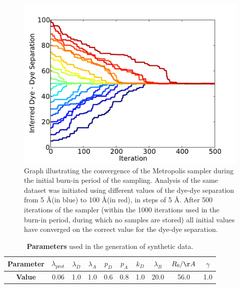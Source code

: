 \begin{figure}
   \begin{center}
      \includegraphics*[width=5in]{inference/S3_samples_summary_rsep.pdf}
      \caption{Graph illustrating the convergence of the Metropolis sampler during the initial burn-in period of the sampling. Analysis of the same dataset was initiated using different values of the dye-dye separation from 5 \AA (in blue) to 100 \AA (in red), in steps of 5 \AA. After 500 iterations of the sampler (within the 1000 iterations used in the burn-in period, during which no samples are stored) all initial values have converged on the correct value for the dye-dye separation.}
      \label{fig:MC_burnin_convergence}
   \end{center}
\end{figure}


\begin{center}
\begin{table}[ht]
\caption{{\bf{Parameters}} used in the generation of synthetic data.}
\begin{tabular}{|cccccccccc|}
\hline
\textbf{Parameter} & $\lambda_{\text{prot}}$ & $\lambda_{D}$ & $\lambda_{A}$ & $p_D$ & $p_A$ & $k_D$ & $\lambda_{B}$ & $R_0 / \AA$ & $\gamma$ \\
\hline
\textbf{Value} & 0.06 & 1.0 & 1.0 & 0.6 & 0.8 & 1.0 & 20.0 & 56.0 & 1.0 \\
\hline
\end{tabular}
\label{tab:shared}
\end{table} 
\end{center}


